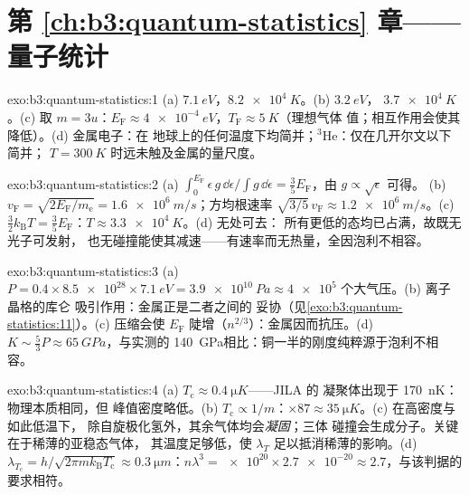 \section*{第 \ref{ch:b3:quantum-statistics} 章——量子统计}

\begin{solution}{exo:b3:quantum-statistics:1}
(a) $\qty{7.1}{eV}$，$\qty{8.2e4}{K}$。(b) $\qty{3.2}{eV}$，
$\qty{3.7e4}{K}$。(c) 取 $m = 3u$：$E_{\text{F}} \approx
\qty{4e-4}{eV}$，$T_{\text{F}} \approx \qty{5}{K}$（理想气体
值；相互作用会使其降低）。(d) 金属电子：在
地球上的任何温度下均简并；$^3$He：仅在几开尔文以下简并；
$T = \qty{300}{K}$ 时远未触及金属的量尺度。
\end{solution}

\begin{solution}{exo:b3:quantum-statistics:2}
(a) $\int_0^{E_{\text{F}}}\epsilon\,g\,\dd\epsilon/\int g\,\dd
\epsilon = \tfrac35 E_{\text{F}}$，由 $g \propto \sqrt\epsilon$ 可得。
(b) $v_{\text{F}} = \sqrt{2E_{\text{F}}/m_{\text{e}}} =
\qty{1.6e6}{m/s}$；方均根速率 $\sqrt{3/5}\,v_{\text{F}} \approx
\qty{1.2e6}{m/s}$。(c) $\tfrac32 k_{\text{B}}T = \tfrac35
E_{\text{F}}$：$T \approx \qty{3.3e4}{K}$。(d) 无处可去：
所有更低的态均已占满，故既无光子可发射，
也无碰撞能使其减速——有速率而无热量，全因泡利不相容。
\end{solution}

\begin{solution}{exo:b3:quantum-statistics:3}
(a) $P = 0.4 \times \num{8.5e28} \times \qty{7.1}{eV} =
\qty{3.9e10}{Pa} \approx \num{4e5}$ 个大气压。(b) 离子晶格的库仑
吸引作用：金属正是二者之间的
妥协（见\cref{exo:b3:quantum-statistics:11}）。(c) 压缩会使
$E_{\text{F}}$ 陡增（$n^{2/3}$）：金属因而抗压。(d) $K \sim
\tfrac53 P \approx \qty{65}{GPa}$，与实测的
\qty{140}{GPa}相比：铜一半的刚度纯粹源于泡利不相容。
\end{solution}

\begin{solution}{exo:b3:quantum-statistics:4}
(a) $T_{\text{c}} \approx \qty{0.4}{\micro K}$——JILA 的
凝聚体出现于 \qty{170}{nK}：物理本质相同，但
峰值密度略低。(b) $T_{\text{c}} \propto 1/m$：$\times87 \approx
\qty{35}{\micro K}$。(c) 在高密度与如此低温下，
除自旋极化氢外，其余气体均会\emph{凝固}；三体
碰撞会生成分子。关键在于稀薄的亚稳态气体，
其温度足够低，使 $\lambda_T$ 足以抵消稀薄的影响。(d)
$\lambda_{T_{\text{c}}} = h/\sqrt{2\pi mk_{\text{B}}T_{\text{c}}}
\approx \qty{0.3}{\micro m}$：$n\lambda^3 = \num{e20} \times
\num{2.7e-20} \approx 2.7$，与该判据的要求相符。
\end{solution}

